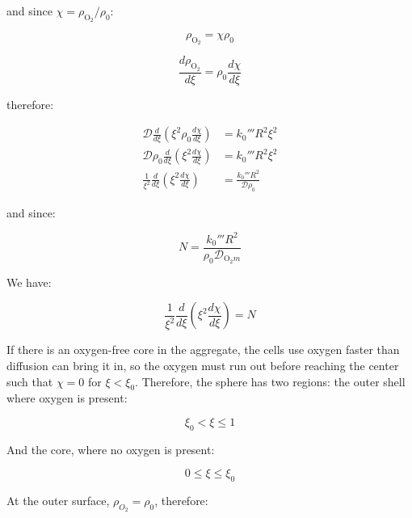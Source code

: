 \documentclass[letterpaper,12pt]{article}
\begin{document}
and since $\chi = \rho_{\mathrm{O}_2} / \rho_0$:

\begin{equation}
    \rho_{\mathrm{O}_2} = \chi \rho_0
\end{equation}

\begin{equation}
    \frac{d \rho_{\mathrm{O}_2}}{d \xi} = \rho_0 \frac{d \chi}{d \xi}
\end{equation}

therefore:

\begin{equation}
\begin{aligned}
    \mathcal{D} \frac{d}{d \xi} \left( \xi^2 \rho_0 \frac{d \chi}{d \xi}\right) &= k_0''' R^2 \xi^2 \\
    \mathcal{D} \rho_0 \frac{d}{d \xi} \left( \xi^2 \frac{d \chi}{d \xi}\right) &= k_0''' R^2 \xi^2 \\
    \frac{1}{\xi^2} \frac{d}{d \xi} \left( \xi^2 \frac{d \chi}{d \xi}\right) &= \frac{k_0''' R^2}{\mathcal{D} \rho_0 }
\end{aligned}
\end{equation}

and since:

\begin{equation}
    N = \frac{k_0''' R^2}{\rho_0 \mathcal{D}_{\mathrm{O}_2 m}}
\end{equation}

We have:

\begin{equation}
\boxed{
    \frac{1}{\xi^2} \frac{d}{d \xi} \left( \xi^2 \frac{d \chi}{d \xi}\right) = N
}
\end{equation}

If there is an oxygen-free core in the aggregate, the cells use oxygen faster than diffusion can bring it in, so the oxygen must run out before reaching the center such that $\chi = 0$ for $\xi < \xi_0$. Therefore, the sphere has two regions: the outer shell where oxygen is present:

\begin{equation}
    \xi_0 < \xi \leq 1 
\end{equation}

And the core, where no oxygen is present:

\begin{equation}
    0 \leq \xi \leq \xi_0
\end{equation}

At the outer surface, $\rho_{O_2} = \rho_0$, therefore:
\end{document}
